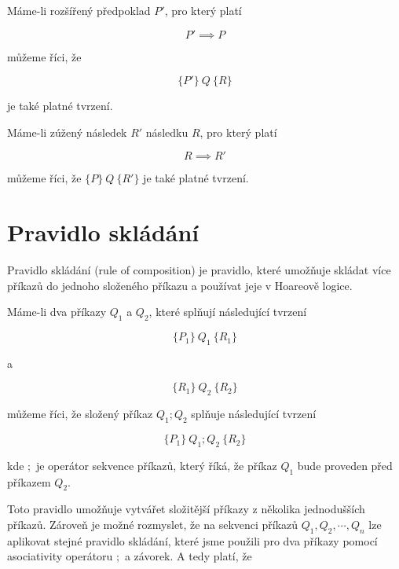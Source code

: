 Máme-li rozšířený předpoklad $P'$, pro který platí

\begin{equation*}
    P' \implies P
\end{equation*}

můžeme říci, že

\begin{equation*}
    \{ P' \} \  Q \  \{ R \}
\end{equation*}

je také platné tvrzení.

Máme-li zúžený následek $R'$ následku $R$, pro který platí

\begin{equation*}
    R \implies R'
\end{equation*}

můžeme říci, že $\{ P \} \  Q \  \{ R' \}$ je také platné tvrzení.

\section{Pravidlo skládání}
\label{sec:hoare-pravidlo-skladani}

Pravidlo skládání (rule of composition) je pravidlo, které umožňuje
skládat více příkazů do jednoho složeného příkazu a používat jeje v Hoareově logice.

Máme-li dva příkazy $Q_1$ a $Q_2$, které splňují následující tvrzení

\begin{equation*}
    \{ P_1 \} \  Q_1 \  \{ R_1 \}
\end{equation*}

a

\begin{equation*}
    \{ R_1 \} \  Q_2 \  \{ R_2 \}
\end{equation*}

můžeme říci, že složený příkaz $Q_1; Q_2$ splňuje následující tvrzení

\begin{equation*}
    \{ P_1 \} \  Q_1; Q_2 \  \{ R_2 \}
\end{equation*}

kde $;$ je operátor sekvence příkazů, který říká, že příkaz $Q_1$ bude proveden před příkazem $Q_2$.

Toto pravidlo umožňuje vytvářet složitější příkazy z několika jednodušších příkazů.
Zároveň je možné rozmyslet, že na sekvenci příkazů $Q_1, Q_2, \cdots, Q_n$
lze aplikovat stejné pravidlo skládání, které jsme použili pro dva příkazy
pomocí asociativity operátoru $;$ a závorek. A tedy platí, že

